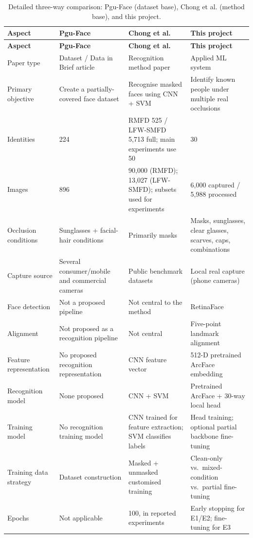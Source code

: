 \documentclass[11pt]{article}
\begin{document}
\begin{longtable}{L{2.6cm}L{3.6cm}L{3.9cm}L{4.1cm}}
\caption{Detailed three-way comparison: Pgu-Face (dataset base), Chong et al. (method base), and this project.}
\label{tab:comparison}\\
\toprule
\textbf{Aspect} & \textbf{Pgu-Face \cite{pguface2016}} & \textbf{Chong et al. \cite{chong2022svm}} & \textbf{This project} \\
\midrule
\endfirsthead
\toprule
\textbf{Aspect} & \textbf{Pgu-Face \cite{pguface2016}} & \textbf{Chong et al. \cite{chong2022svm}} & \textbf{This project} \\
\midrule
\endhead
Paper type & Dataset / Data in Brief article & Recognition method paper & Applied ML system \\
Primary objective & Create a partially-covered face dataset & Recognise masked faces using CNN + SVM & Identify known people under multiple real occlusions \\
Identities & 224 & RMFD 525 / LFW-SMFD 5{,}713 full; main experiments use 50 & 30 \\
Images & 896 & 90{,}000 (RMFD); 13{,}027 (LFW-SMFD); subsets used for experiments & 6{,}000 captured / 5{,}988 processed \\
Occlusion conditions & Sunglasses + facial-hair conditions & Primarily masks & Masks, sunglasses, clear glasses, scarves, caps, combinations \\
Capture source & Several consumer/mobile and commercial cameras & Public benchmark datasets & Local real capture (phone cameras) \\
Face detection & Not a proposed pipeline & Not central to the method & RetinaFace \\
Alignment & Not proposed as a recognition pipeline & Not central & Five-point landmark alignment \\
Feature representation & No proposed recognition representation & CNN feature vector & 512-D pretrained ArcFace embedding \\
Recognition model & None proposed & CNN + SVM & Pretrained ArcFace + 30-way local head \\
Training model & No recognition training model & CNN trained for feature extraction; SVM classifies labels & Head training; optional partial backbone fine-tuning \\
Training data strategy & Dataset construction & Masked + unmasked customised training & Clean-only vs.\ mixed-condition vs.\ partial fine-tuning \\
Epochs & Not applicable & 100, in reported experiments & Early stopping for E1/E2; fine-tuning for E3 \\

\end{longtable}
\end{document}
